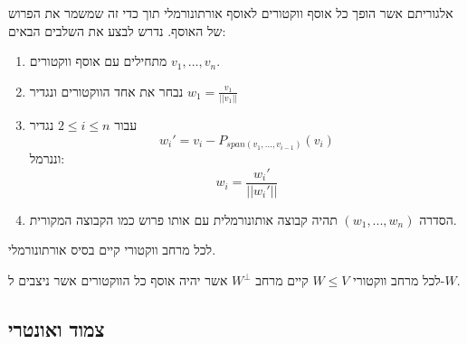 \documentclass{tstextbook}
\begin{document}
\begin{proposition}
אלגוריתם אשר הופך כל אוסף ווקטורים לאוסף אורתונורמלי תוך כדי זה שמשמר את הפרוש של האוסף. נדרש לבצע את השלבים הבאים:

  \begin{enumerate}
    \item מתחילים עם אוסף ווקטורים \(v_1,...,v_n\).  


    \item נבחר את אחד הווקטורים ונגדיר \(w_1=\frac{v_1}{||v_1||}\)


    \item עבור \(2\leq i \leq n\) נגדיר 
$$w_i' = v_i - P_{span(v_1,..., v_{i-1})} (v_i)$$
וננרמל:    $$w_i = \frac{w_i'}{||w_i'||}$$


    \item הסדרה \((w_1,...,w_n)\) תהיה קבוצה אותונורמלית עם אותו פרוש כמו הקבוצה המקורית. 


  \end{enumerate}
\end{proposition}
\begin{corollary}
לכל מרחב ווקטורי קיים בסיס אורתונורמלי.

\end{corollary}
\begin{definition}
לכל מרחב ווקטורי \(W\leq V\) קיים מרחב \(W^{\perp}\) אשר יהיה אוסף כל הווקטורים אשר ניצבים ל-\(W\).

\end{definition}
\subsection{צמוד ואונטרי}
\end{document}
